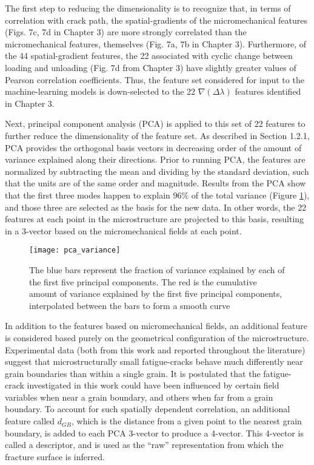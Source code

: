The first step to reducing the dimensionality is to recognize that, in terms of correlation with crack path, the spatial-gradients of the micromechanical features (Figs. 7c, 7d in Chapter 3) are more strongly correlated than the micromechanical features, themselves (Fig. 7a, 7b in Chapter 3).  Furthermore, of the 44 spatial-gradient features, the 22 associated with cyclic change between loading and unloading (Fig. 7d from Chapter 3) have slightly greater values of Pearson correlation coefficients. Thus, the feature set considered for input to the machine-learning models is down-selected to the 22 $\nabla (\Delta \lambda)$ features identified in Chapter 3.

Next, principal component analysis (PCA) is applied to this set of 22 features to further reduce the dimensionality of the feature set.  As described in Section 1.2.1, PCA provides the orthogonal basis vectors in decreasing order of the amount of variance explained along their directions.  Prior to running PCA, the features are normalized by subtracting the mean and dividing by the standard deviation, such that the units are of the same order and magnitude.  Results from the PCA show that the first three modes happen to explain $96\%$ of the total variance (Figure \ref{fig:pca_variance}), and those three are selected as the basis for the new data.  In other words, the 22 features at each point in the microstructure are projected to this basis, resulting in a 3-vector based on the micromechanical fields at each point.

\begin{figure}[b]
  \centering
    \texttt{[image: pca\_variance]}
    \caption{The blue bars represent the fraction of variance explained by each of the first five principal components. The red is the cumulative amount of variance explained by the first five principal components, interpolated between the bars to form a smooth curve}
  \label{fig:pca_variance}
\end{figure}

In addition to the features based on micromechanical fields, an additional feature is considered based purely on the geometrical configuration of the microstructure.  Experimental data (both from this work and reported throughout the literature) suggest that microstructurally small fatigue-cracks behave much differently near grain boundaries than within a single grain.  It is postulated that the fatigue-crack investigated in this work could have been influenced by certain field variables when near a grain boundary, and others when far from a grain boundary.  To account for such spatially dependent correlation, an additional feature called $d_{GB}$, which is the distance from a given point to the nearest grain boundary, is added to each PCA 3-vector to produce a 4-vector.  This 4-vector is called a descriptor, and is used as the ``raw'' representation from which the fracture surface is inferred.

